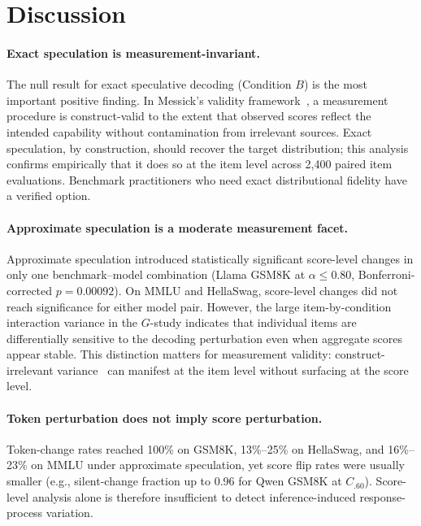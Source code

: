 \documentclass{article}
\begin{document}
\section{Discussion}

\paragraph{Exact speculation is measurement-invariant.} The null result for exact speculative decoding (Condition $B$) is the most important positive finding. In Messick's validity framework~\citep{messick1995validity}, a measurement procedure is construct-valid to the extent that observed scores reflect the intended capability without contamination from irrelevant sources. Exact speculation, by construction, should recover the target distribution; this analysis confirms empirically that it does so at the item level across 2,400 paired item evaluations. Benchmark practitioners who need exact distributional fidelity have a verified option.

\paragraph{Approximate speculation is a moderate measurement facet.} Approximate speculation introduced statistically significant score-level changes in only one benchmark--model combination (Llama GSM8K at $\alpha \leq 0.80$, Bonferroni-corrected $p = 0.00092$). On MMLU and HellaSwag, score-level changes did not reach significance for either model pair. However, the large item-by-condition interaction variance in the $G$-study indicates that individual items are differentially sensitive to the decoding perturbation even when aggregate scores appear stable. This distinction matters for measurement validity: construct-irrelevant variance~\citep{messick1995validity} can manifest at the item level without surfacing at the score level.

\paragraph{Token perturbation does not imply score perturbation.} Token-change rates reached 100\% on GSM8K, 13\%--25\% on HellaSwag, and 16\%--23\% on MMLU under approximate speculation, yet score flip rates were usually smaller (e.g., silent-change fraction up to 0.96 for Qwen GSM8K at $C_{.60}$). Score-level analysis alone is therefore insufficient to detect inference-induced response-process variation.
\end{document}
